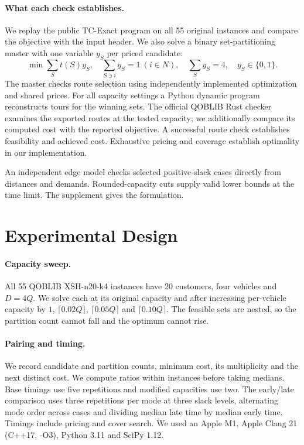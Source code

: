 \documentclass[runningheads]{llncs}
\begin{document}
\paragraph{What each check establishes.}
We replay the public TC-Exact program on all 55 original instances and compare the objective with the input header. We also solve a binary set-partitioning master with one variable $y_S$ per priced candidate:
\begin{equation}
 \min\sum_S t(S)y_S,\quad \sum_{S\ni i}y_S=1\ (i\in N),\quad
 \sum_S y_S=4,\quad y_S\in\{0,1\}.
\end{equation}
The master checks route selection using independently implemented optimization and shared prices. For all capacity settings a Python dynamic program reconstructs tours for the winning sets. The official QOBLIB Rust checker examines the exported routes at the tested capacity; we additionally compare its computed cost with the reported objective. A successful route check establishes feasibility and achieved cost. Exhaustive pricing and coverage establish optimality in our implementation.

An independent edge model checks selected positive-slack cases directly from distances and demands. Rounded-capacity cuts supply valid lower bounds at the time limit. The supplement gives the formulation.
\section{Experimental Design}
\paragraph{Capacity sweep.}
All 55 QOBLIB XSH-n20-k4 instances have 20 customers, four vehicles and $D=4Q$. We solve each at its original capacity and after increasing per-vehicle capacity by $1$, $\lceil0.02Q\rceil$, $\lceil0.05Q\rceil$ and $\lceil0.10Q\rceil$. The feasible sets are nested, so the partition count cannot fall and the optimum cannot rise.

\paragraph{Pairing and timing.}
We record candidate and partition counts, minimum cost, its multiplicity and the next distinct cost. We compute ratios within instances before taking medians. Base timings use five repetitions and modified capacities use two. The early/late comparison uses three repetitions per mode at three slack levels, alternating mode order across cases and dividing median late time by median early time. Timings include pricing and cover search. We used an Apple M1, Apple Clang 21 (C++17, -O3), Python 3.11 and SciPy 1.12.
\end{document}
